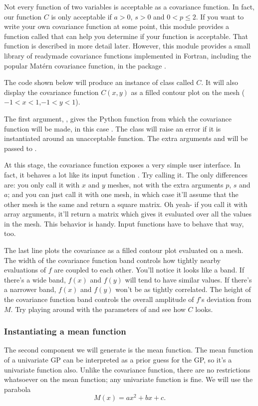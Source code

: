 \documentclass{manual}
\begin{document}
Not every function of two variables is acceptable as a covariance function. In fact, our function $C$ is only acceptable if $a>0$, $s>0$ and $0<p\le2$. If you want to write your own covariance function at some point, this module provides a function called  that can help you determine if your function is acceptable. That function is described in more detail later. However, this module provides a small library of readymade covariance functions implemented in Fortran, including the popular Mat\'ern covariance function, in the package . 

The code shown below will produce an instance of class  called $C$. It will also display the covariance function $C(x,y)$ as a filled contour plot on the mesh ($-1<x<1$,$-1<y<1$).


The first argument, , gives the Python function from which the covariance function will be made, in this case . The  class will raise an error if it is instantiated around an unacceptable function. The extra arguments  and  will be passed to . 

At this stage, the covariance function exposes a very simple user interface. In fact, it behaves a lot like its input function . Try calling it. The only differences are: you only call it with $x$ and $y$ meshes, not with the extra arguments $p$, $s$ and $a$; and you can just call it with one mesh, in which case it'll assume that the other mesh is the same and return a square matrix. Oh yeah- if you call it with array arguments, it'll return a matrix which gives it evaluated over all the values in the mesh. This behavior is handy. Input functions have to behave that way, too.

The last line plots the covariance as a filled contour plot evaluated on a mesh. The width of the covariance function band controls how tightly nearby evaluations of $f$ are coupled to each other. You'll notice it looks like a band. If there's a wide band, $f(x)$ and $f(y)$ will tend to have similar values. If there's a narrower band, $f(x)$ and $f(y)$ won't be as tightly correlated. The height of the covariance function band controls the overall amplitude of $f$'s deviation from $M$. Try playing around with the parameters of  and see how $C$ looks.


\subsubsection{Instantiating a mean function}\label{subsub:mean}
The second component we will generate is the mean function. The mean function of a univariate GP can be interpreted as a prior guess for the GP, so it's a univariate function also. Unlike the covariance function, there are no restrictions whatsoever on the mean function; any univariate function is fine. We will use the parabola
\begin{equation}
	M(x) = ax^2 + bx + c.
\end{equation}
\end{document}
